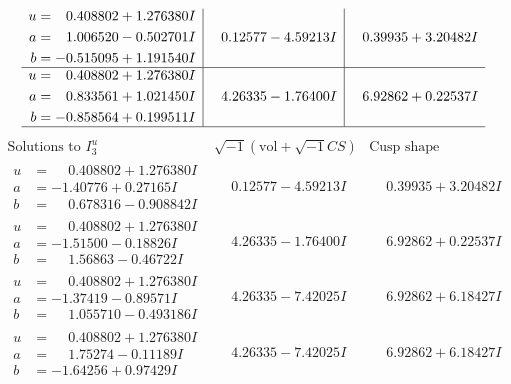 \documentclass[1p]{elsarticle_modified}
\theoremstyle{definition}
\newcommand{\I}{\sqrt{-1}}
\begin{document}
$$\begin{array}{c|c|c}
\begin{aligned}
u &= \phantom{-}0.408802 + 1.276380 I \\
a &= \phantom{-}1.006520 - 0.502701 I \\
b &= -0.515095 + 1.191540 I\end{aligned}
 & \phantom{-}0.12577 - 4.59213 I & \phantom{-}0.39935 + 3.20482 I \\ \hline\begin{aligned}
u &= \phantom{-}0.408802 + 1.276380 I \\
a &= \phantom{-}0.833561 + 1.021450 I \\
b &= -0.858564 + 0.199511 I\end{aligned}
 & \phantom{-}4.26335 - 1.76400 I & \phantom{-}6.92862 + 0.22537 I\\
 \hline 
 \end{array}$$\newpage$$\begin{array}{c|c|c}  
\text{Solutions to }I^u_{3}& \I (\text{vol} + \sqrt{-1}CS) & \text{Cusp shape}\\
 \hline 
\begin{aligned}
u &= \phantom{-}0.408802 + 1.276380 I \\
a &= -1.40776 + 0.27165 I \\
b &= \phantom{-}0.678316 - 0.908842 I\end{aligned}
 & \phantom{-}0.12577 - 4.59213 I & \phantom{-}0.39935 + 3.20482 I \\ \hline\begin{aligned}
u &= \phantom{-}0.408802 + 1.276380 I \\
a &= -1.51500 - 0.18826 I \\
b &= \phantom{-}1.56863 - 0.46722 I\end{aligned}
 & \phantom{-}4.26335 - 1.76400 I & \phantom{-}6.92862 + 0.22537 I \\ \hline\begin{aligned}
u &= \phantom{-}0.408802 + 1.276380 I \\
a &= -1.37419 - 0.89571 I \\
b &= \phantom{-}1.055710 - 0.493186 I\end{aligned}
 & \phantom{-}4.26335 - 7.42025 I & \phantom{-}6.92862 + 6.18427 I \\ \hline\begin{aligned}
u &= \phantom{-}0.408802 + 1.276380 I \\
a &= \phantom{-}1.75274 - 0.11189 I \\
b &= -1.64256 + 0.97429 I\end{aligned}
 & \phantom{-}4.26335 - 7.42025 I & \phantom{-}6.92862 + 6.18427 I \\ \hline\begin{aligned}

\end{aligned}
\end{array}$$
\end{document}
